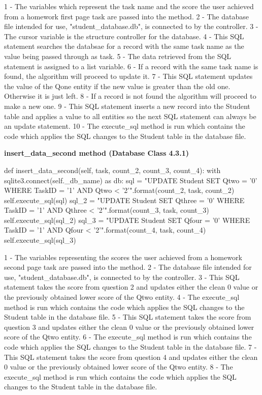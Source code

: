 1 - The variables which represent the task name and the score the user achieved from a homework first page task are passed into the method.
2 - The database file intended for use, "student\_database.db", is connected to by the controller.
3 - The cursor variable is the structure controller for the database.
4 - This SQL statement searches the databsae for a record with the same task name as the value being passed through as task.
5 - The data retrieved from the SQL statement is assigned to a list variable.
6 - If a record with the same task name is found, the algorithm will proceed to update it.
7 - This SQL statement updates the value of the Qone entity if the new value is greater than the old one. Otherwise it is just left.
8 - If a record is not found the algorithm will proceed to make a new one.
9 - This SQL statement inserts a new record into the Student table and applies a value to all entities so the next SQL statement can always be an update statement.
10 - The execute\_sql method is run which contains the code which applies the SQL changes to the Student table in the database file.

\textbf{insert\_data\_second method (Database Class 4.3.1)}

\begin{python}
    def insert_data_second(self, task, count_2, count_3, count_4):
        with sqlite3.connect(self._db_name) as db:
            sql = "UPDATE Student SET Qtwo = '{0}' WHERE TaskID = '{1}' AND Qtwo < '{2}'".format(count_2, task, count_2)
            self.execute_sql(sql)
            sql_2 = "UPDATE Student SET Qthree = '{0}' WHERE TaskID = '{1}' AND Qthree < '{2}'".format(count_3, task, count_3)
            self.execute_sql(sql_2)
            sql_3 = "UPDATE Student SET Qfour = '{0}' WHERE TaskID = '{1}' AND Qfour < '{2}'".format(count_4, task, count_4)
            self.execute_sql(sql_3)
\end{python}

1 - The variables representing the scores the user achieved from a homework second page task are passed into the method.
2 - The database file intended for use, "student\_database.db", is connected to by the controller.
3 - This SQL statement takes the score from question 2 and updates either the clean 0 value or the previously obtained lower score of the Qtwo entity.
4 - The execute\_sql method is run which contains the code which applies the SQL changes to the Student table in the database file.
5 - This SQL statement takes the score from question 3 and updates either the clean 0 value or the previously obtained lower score of the Qtwo entity.
6 - The execute\_sql method is run which contains the code which applies the SQL changes to the Student table in the database file.
7 - This SQL statement takes the score from question 4 and updates either the clean 0 value or the previously obtained lower score of the Qtwo entity.
8 - The execute\_sql method is run which contains the code which applies the SQL changes to the Student table in the database file.

